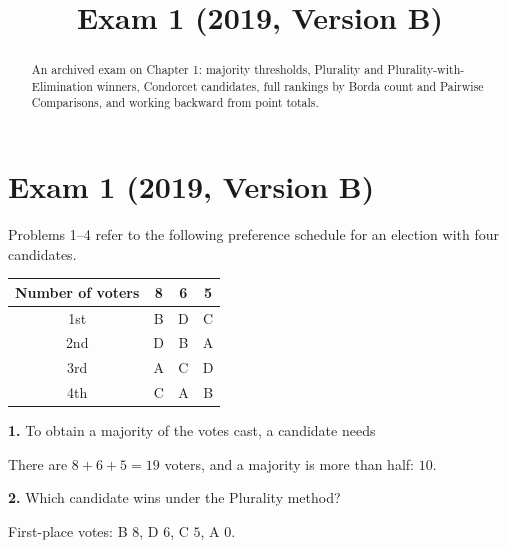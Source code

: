 \documentclass[12pt]{ximera}
\title{Exam 1 (2019, Version B)}
\begin{document}
\begin{abstract}
An archived exam on Chapter 1: majority thresholds, Plurality and
Plurality-with-Elimination winners, Condorcet candidates, full rankings by Borda count
and Pairwise Comparisons, and working backward from point totals.
\end{abstract}
\maketitle

\section*{Exam 1 (2019, Version B)}

\begin{problem}
Problems 1--4 refer to the following preference schedule for an election with four
candidates.
\begin{center}
\begin{tabular}{c|ccc}
Number of voters & 8 & 6 & 5\\\hline
1st & B & D & C\\
2nd & D & B & A\\
3rd & A & C & D\\
4th & C & A & B
\end{tabular}
\end{center}

\begin{prompt}
\textbf{1.} To obtain a majority of the votes cast, a candidate needs

\begin{multipleChoice}
\end{multipleChoice}

\begin{feedback}
There are $8+6+5=19$ voters, and a majority is more than half: $10$.
\end{feedback}
\end{prompt}

\begin{prompt}
\textbf{2.} Which candidate wins under the Plurality method?

\begin{multipleChoice}
\end{multipleChoice}

\begin{feedback}
First-place votes: B $8$, D $6$, C $5$, A $0$.
\end{feedback}
\end{prompt}


\end{problem}
\end{document}
